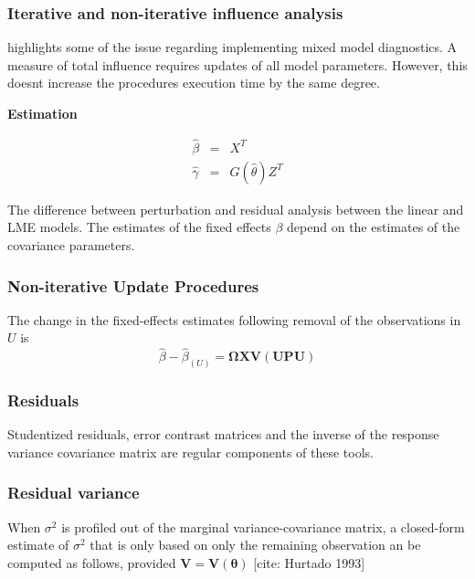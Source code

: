 \documentclass[12pt, a4paper]{report}
\theoremstyle{plain}
\theoremstyle{definition}
\theoremstyle{remark}
\begin{document}
	
	\subsubsection{Iterative and non-iterative influence analysis}
	\citet{schabenberger} highlights some of the issue regarding implementing mixed model diagnostics.
	A measure of total influence requires updates of all model parameters.
	However, this doesnt increase the procedures execution time by the same degree.
	
	\noindent \textbf{Estimation}
	
	\begin{eqnarray}
	\hat{\beta} &=& X^{T} \\
	\hat{\gamma} &=& G(\hat{\theta})Z^{T}
	\end{eqnarray}
	
	The difference between perturbation and residual analysis between the linear and LME models.
	The estimates of the fixed effects $\beta$ depend on the estimates of the covariance parameters.
	
	
	
	
	
	\subsubsection{Non-iterative Update Procedures}
	
	
	The change in the fixed-effects estimates following removal of the observations in $U$ is
	\[ \hat{\beta} - \hat{\beta}_{(U)} = \boldsymbol{\Omega}\boldsymbol{X}\boldsymbol{V}
	\left( \boldsymbol{U} \boldsymbol{P}\boldsymbol{U}\right)   \]
	\subsubsection*{Residuals}
	Studentized residuals, error contrast matrices and the inverse of the response variance covariance matrix are regular components of these tools.
	
	
	
	
	
	

	\subsubsection{Residual variance}
	When $\sigma^2$ is profiled out of the marginal variance-covariance matrix, a closed-form estimate of $\sigma^2$ that is only based on only the remaining observation
	an be computed as follows, provided $\boldsymbol{V} = \boldsymbol{V}(\boldsymbol{\theta}) $
	[cite: Hurtado 1993]
	
\end{document}
